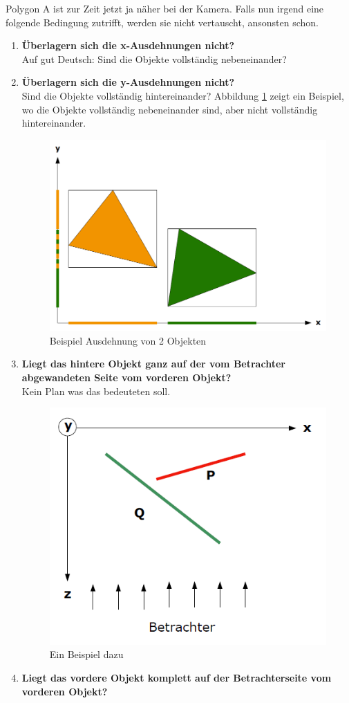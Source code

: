 Polygon A ist zur Zeit jetzt ja näher bei der Kamera. Falls nun irgend eine folgende Bedingung zutrifft, werden sie nicht vertauscht, ansonsten schon.

\begin{enumerate}
	\item \textbf{Überlagern sich die x-Ausdehnungen nicht?} \\
	Auf gut Deutsch: Sind die Objekte vollständig nebeneinander?
	\item \textbf{Überlagern sich die y-Ausdehnungen nicht?} \\
	Sind die Objekte vollständig hintereinander? Abbildung \ref{fig:ausdehnungen} zeigt ein Beispiel, wo die Objekte vollständig nebeneinander sind, aber nicht vollständig hintereinander.
	\begin{figure}[!ht]
		\centering
		\includegraphics[width=0.5\linewidth]{fig/ausdehnungen}
		\caption{Beispiel Ausdehnung von 2 Objekten}
		\label{fig:ausdehnungen}
	\end{figure}
	\item \textbf{Liegt das hintere Objekt ganz auf der vom Betrachter abgewandeten Seite vom vorderen Objekt?} \\
	Kein Plan was das bedeuteten soll.
	\begin{figure}[!ht]
		\centering
		\includegraphics[width=0.5\linewidth]{fig/tiefensortierung_3}
		\caption{Ein Beispiel dazu}
		\label{fig:tiefensortierung_3}
	\end{figure}
	\item \textbf{Liegt das vordere Objekt komplett auf der Betrachterseite vom vorderen Objekt?}\\

\end{enumerate}
